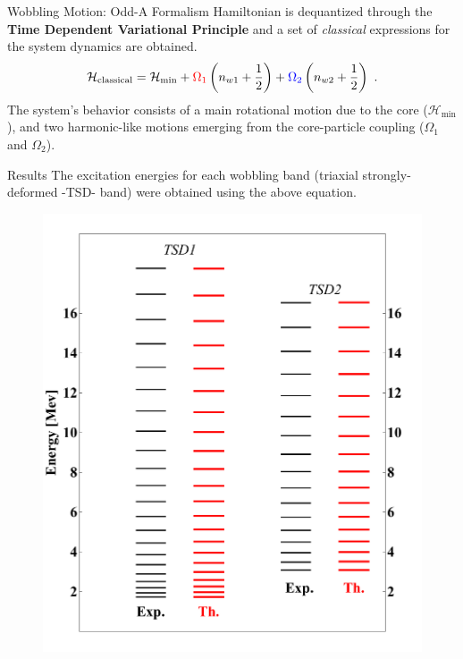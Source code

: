 \documentclass[final]{beamer}
\newlength{\colwidth}
\begin{document}
\begin{frame}[t]
\begin{columns}[t]
\begin{column}{\colwidth}
\begin{block}{Wobbling Motion: Odd-A Formalism}
Hamiltonian is dequantized through the \textbf{Time Dependent Variational Principle} and a set of \emph{classical} expressions for the system dynamics are obtained.
\begin{align}
    \mathcal{H}_\text{classical}=\mathcal{H}_\text{min}+{\color{red}\Omega_1}\left(n_{w1}+\frac{1}{2}\right)+{\color{blue}\Omega_2}\left(n_{w2}+\frac{1}{2}\right)\ .
\end{align}
The system's behavior consists of a main rotational motion due to the core ($\mathcal{H}_\text{min}$), and two harmonic-like motions emerging from the core-particle coupling ($\Omega_1$ and $\Omega_2$).
  \end{block}
    \begin{block}{Results}
    The excitation energies for each wobbling band (triaxial strongly-deformed -TSD- band) were obtained using the above equation.
  \begin{figure}
\centering
\begin{minipage}{.5\textwidth}
  \centering
  \includegraphics[scale=0.9]{images/TSD-12.pdf}
\end{minipage}%
\begin{minipage}{.5\textwidth}

\end{minipage}
\end{figure}
\end{block}
\end{column}
\end{columns}
\end{frame}
\end{document}
